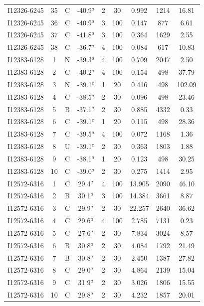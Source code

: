 \begin{table}
\begin{tabular}{ccccccccc}
I12326-6245 & 35 & C & -40.9$^{a}$ & 2 & 30 & 0.992 & 1214 & 16.81 \\
I12326-6245 & 36 & C & -40.9$^{a}$ & 3 & 100 & 0.147 & 877 & 6.61 \\
I12326-6245 & 37 & C & -41.8$^{a}$ & 3 & 100 & 0.364 & 1629 & 2.55 \\
I12326-6245 & 38 & C & -36.7$^{a}$ & 4 & 100 & 0.084 & 617 & 10.83 \\
I12383-6128 & 1 & N & -39.3$^{a}$ & 4 & 100 & 0.709 & 2047 & 2.50 \\
I12383-6128 & 2 & C & -40.2$^{a}$ & 4 & 100 & 0.154 & 498 & 37.79 \\
I12383-6128 & 3 & N & -39.1$^{e}$ & 1 & 20 & 0.416 & 498 & 102.09 \\
I12383-6128 & 4 & C & -38.5$^{a}$ & 2 & 30 & 0.096 & 498 & 23.46 \\
I12383-6128 & 5 & B & -37.1$^{a}$ & 2 & 30 & 0.885 & 4332 & 0.33 \\
I12383-6128 & 6 & C & -39.1$^{e}$ & 1 & 20 & 0.115 & 498 & 28.36 \\
I12383-6128 & 7 & C & -39.5$^{a}$ & 4 & 100 & 0.072 & 1168 & 1.36 \\
I12383-6128 & 8 & U & -39.1$^{e}$ & 2 & 30 & 0.363 & 1803 & 1.88 \\
I12383-6128 & 9 & C & -38.1$^{a}$ & 1 & 20 & 0.123 & 498 & 30.25 \\
I12383-6128 & 10 & C & -39.0$^{a}$ & 2 & 30 & 0.275 & 1414 & 2.95 \\
I12572-6316 & 1 & C & 29.4$^{a}$ & 4 & 100 & 13.905 & 2090 & 46.10 \\
I12572-6316 & 2 & B & 30.1$^{a}$ & 3 & 100 & 14.384 & 3661 & 8.87 \\
I12572-6316 & 3 & C & 29.9$^{a}$ & 2 & 30 & 22.257 & 2640 & 36.62 \\
I12572-6316 & 4 & C & 29.6$^{a}$ & 4 & 100 & 2.785 & 7131 & 0.23 \\
I12572-6316 & 5 & C & 27.6$^{a}$ & 2 & 30 & 7.834 & 3024 & 8.57 \\
I12572-6316 & 6 & B & 30.8$^{a}$ & 2 & 30 & 4.084 & 1792 & 21.49 \\
I12572-6316 & 7 & B & 30.8$^{a}$ & 2 & 30 & 2.450 & 1387 & 27.82 \\
I12572-6316 & 8 & C & 29.0$^{a}$ & 2 & 30 & 4.864 & 2139 & 15.04 \\
I12572-6316 & 9 & C & 31.9$^{a}$ & 2 & 30 & 3.026 & 1806 & 15.55 \\
I12572-6316 & 10 & C & 29.8$^{a}$ & 2 & 30 & 4.232 & 1857 & 20.01 \\

\end{tabular}
\end{table}
